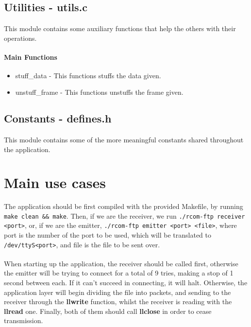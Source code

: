 \documentclass[11pt]{article}
\begin{document}
\subsection{Utilities - utils.c}

\paragraph{}This module contains some auxiliary functions that help the others with their operations.

\paragraph{Main Functions}

\begin{itemize}
        \item{stuff\_data - This functions stuffs the data given.}
        \item{unstuff\_frame - This functions unstuffs the frame given.}
\end{itemize}

\subsection{Constants - defines.h}

\paragraph{}This module contains some of the more meaningful constants shared throughout the application.

\section{Main use cases}

\paragraph{}The application should be first compiled with the provided Makefile, by running
\verb|make clean && make|. Then, if we are the receiver, we run \verb|./rcom-ftp receiver <port>|, or, if we
are the emitter, \verb|./rcom-ftp emitter <port> <file>|, where port is the number of the port to be used,
which will be translated to \verb|/dev/ttyS<port>|, and file is the file to be sent over.

\paragraph{} When starting up the application, the receiver should be called first, otherwise the emitter
will be trying to connect for a total of 9 tries, making a stop of 1 second between each. If it can't
succeed in connecting, it will halt. Otherwise, the application layer will begin dividing the file into
packets, and sending to the receiver through the \textbf{llwrite} function, whilst the receiver is reading
with the \textbf{llread} one. Finally, both of them should call \textbf{llclose} in order to cease
transmission.
\end{document}
